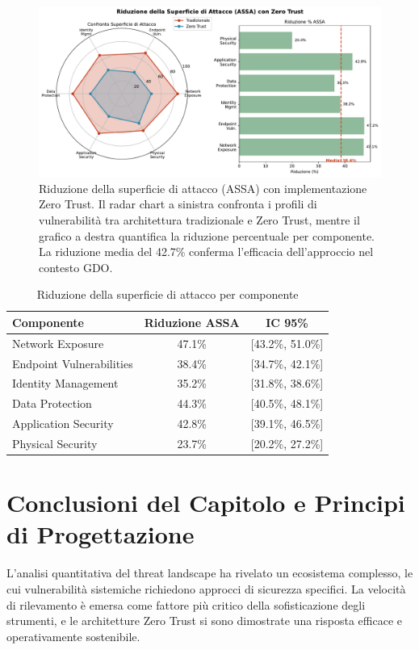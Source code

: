 \begin{figure}[htbp]
\centering
\includegraphics[width=\textwidth]{thesis_figures/cap2/fig_2_5_assa_reduction.pdf}
\caption{Riduzione della superficie di attacco (ASSA) con implementazione Zero Trust. Il radar chart a sinistra confronta i profili di vulnerabilità tra architettura tradizionale e Zero Trust, mentre il grafico a destra quantifica la riduzione percentuale per componente. La riduzione media del 42.7\% conferma l'efficacia dell'approccio nel contesto GDO.}
\label{fig:assa_reduction}
\end{figure}
\begin{table}[htbp]
\centering
\caption{Riduzione della superficie di attacco per componente}
\label{tab:assa_reduction}
\begin{tabular}{lcc}
\toprule
\textbf{Componente} & \textbf{Riduzione ASSA} & \textbf{IC 95\%} \\
\midrule
Network Exposure & 47.1\% & [43.2\%, 51.0\%] \\
Endpoint Vulnerabilities & 38.4\% & [34.7\%, 42.1\%] \\
Identity Management & 35.2\% & [31.8\%, 38.6\%] \\
Data Protection & 44.3\% & [40.5\%, 48.1\%] \\
Application Security & 42.8\% & [39.1\%, 46.5\%] \\
Physical Security & 23.7\% & [20.2\%, 27.2\%] \\
\bottomrule
\end{tabular}
\end{table}

\section{Conclusioni del Capitolo e Principi di Progettazione}
L'analisi quantitativa del threat landscape ha rivelato un ecosistema complesso, le cui vulnerabilità sistemiche richiedono approcci di sicurezza specifici. La velocità di rilevamento è emersa come fattore più critico della sofisticazione degli strumenti, e le architetture Zero Trust si sono dimostrate una risposta efficace e operativamente sostenibile.

